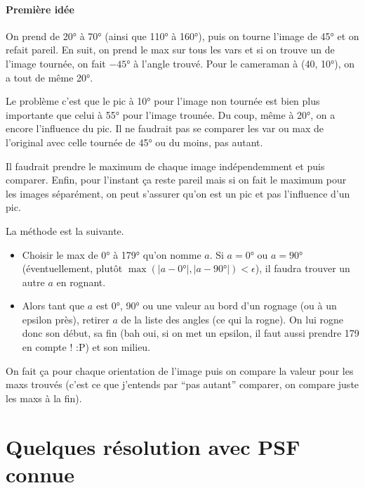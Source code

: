 \documentclass{article}
\begin{document}
\paragraph{Première idée}
On prend de \ang{20} à \ang{70} (ainsi que \ang{110} à \ang{160}), puis on tourne l'image de \ang{45} et on refait pareil.
En suit, on prend le max sur tous les vars et si on trouve un de l'image tournée, on fait $-\ang{45}$ à l'angle trouvé.
Pour le cameraman à (40, \ang{10}), on a tout de même \ang{20}.

Le problème c'est que le pic à \ang{10} pour l'image non tournée est bien plus importante que celui à \ang{55} pour l'image trounée.
Du coup, même à \ang{20}, on a encore l'influence du pic.
Il ne faudrait pas se comparer les var ou max de l'original avec celle tournée de \ang{45} ou du moins, pas autant.

Il faudrait prendre le maximum de chaque image indépendemment et puis comparer.
Enfin, pour l'instant ça reste pareil mais si on fait le maximum pour les images séparément, on peut s'assurer qu'on est un pic et pas l'influence d'un pic.

La méthode est la suivante.
\begin{itemize}
  \item Choisir le max de \ang{0} à \ang{179} qu'on nomme $a$.
    Si $a = \ang{0}$ ou $a = \ang{90}$ (éventuellement, plutôt $\max(|a - \ang{0}|, |a-\ang{90}|) < \epsilon$), il faudra trouver un autre $a$ en rognant.
  \item
    Alors tant que $a$ est \ang{0}, \ang{90} ou une valeur au bord d'un rognage (ou à un epsilon près),
    retirer $a$ de la liste des angles (ce qui la rogne).
    On lui rogne donc son début, sa fin (bah oui, si on met un epsilon, il faut aussi prendre 179 en compte ! :P) et son milieu.
\end{itemize}
On fait ça pour chaque orientation de l'image puis on compare la valeur pour les maxs trouvés (c'est ce que j'entends par ``pas autant'' comparer, on compare juste les maxs à la fin).

\section{Quelques résolution avec PSF connue}
\end{document}
